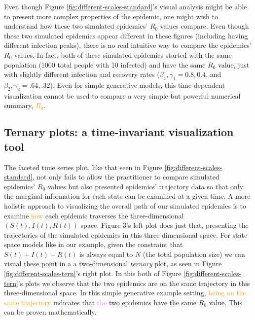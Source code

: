 \documentclass[
  shortnames]{jss}
\begin{document}
Even though Figure \ref{fig:different-scales-standard}'s visual analysis
might be able to present more complex properties of the epidemic, one
might wish to understand how these two simulated epidemics' \(R_0\)
values compare. Even though these two simulated epidemics appear
different in these figures (including having different infection peaks),
there is no real intuitive way to compare the epidemics' \(R_0\) values.
In fact, both of these simulated epidemics started with the same
population (1000 total people with 10 infected) and have the same
\(R_0\) value, just with slightly different infection and recovery rates
(\(\beta_1, \gamma_1 = 0.8, 0.4\), and
\(\beta_2, \gamma_2 = .64, .32\)). Even for simple generative models,
this time-dependent visualization cannot be used to compare a very
simple but powerful numerical summary, \textcolor{orange}{$R_0$}.

\hypertarget{ternary-plots-a-time-invariant-visualization-tool}{%
\subsection{Ternary plots: a time-invariant visualization
tool}\label{ternary-plots-a-time-invariant-visualization-tool}}

The faceted time series plot, like that seen in Figure
\ref{fig:different-scales-standard}, not only fails to allow the
practitioner to compare simulated epidemics' \(R_0\) values but also
presented epidemics' trajectory data so that only the marginal
information for each state can be examined at a given time. A more
holistic approach to visualizing the overall path of our simulated
epidemics is to examine \textcolor{orange}{how} each epidemic traverses
the three-dimensional \((S(t),I(t),R(t))\) space. Figure 3's left plot
does just that, presenting the trajectories of the simulated epidemics
in this three-dimensional space. For state space models like in our
example, given the constraint that \(S(t) + I(t)+R(t)\) is always equal
to \(N\) (the total population size) we can visual these point in a a
two-dimensional \textit{ternary} plot, as seen in Figure
\ref{fig:different-scales-tern}'s right plot. In this both of Figure
\ref{fig:different-scales-tern}'s plots we observe that the two
epidemics are on the same trajectory in this three-dimensional space. In
this simple generative example setting,
\textcolor{orange}{being on the same trajectory} indicates that
\textcolor{violet}{the} two epidemics have the same \(R_0\) value. This
can be proven mathematically.
\end{document}
